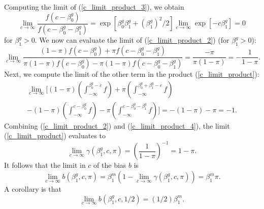 \documentclass[12pt]{article}
\begin{document}
Computing the limit of (\ref{c_limit_product_3}), we obtain
$$
\lim_{c \to \infty} \frac{f(c - \beta^g_0)}{f(c - \beta^g_0 - \beta^g_1)} = \exp[ \beta^g_0 \beta^g_1 + (\beta^g_1)^2/2] \lim_{c \to \infty} \exp[ -c \beta^g_1] = 0
$$ for $\beta^g_1 > 0$. We now can evaluate the limit of (\ref{c_limit_product_2}) (for $\beta^g_1 > 0$):
$$ \lim_{c \to \infty} \frac{(1-\pi) f(c - \beta^g_0) + \pi f(c - \beta^g_0 - \beta^g_1)}{\pi (1-\pi) f(c - \beta^g_0) - \pi (1-\pi)f(c - \beta^g_0 - \beta^g_1)} = \frac{-\pi}{\pi(1-\pi)} = -\frac{1}{1 -\pi}.$$ Next, we compute the limit of the other term in the product (\ref{c_limit_product}):
\begin{multline}\label{c_limit_product_4}
\lim_{c \to \infty} \bigg[ (1-\pi)\left( \int_{-\infty}^{\beta_0^g - c} f \right) + \pi \left(\int_{-\infty}^{ \beta^g_0 + \beta^g_1 - c} f \right) \\ - (1-\pi)\left(\int_{-\infty}^{c - \beta^g_0} f \right) - \pi \left(\int_{-\infty}^{c - \beta_0^g - \beta_1^g} f \right) \bigg] = -(1-\pi) - \pi = -1.
\end{multline}
Combining (\ref{c_limit_product_2}) and (\ref{c_limit_product_4}), the limit (\ref{c_limit_product}) evaluates to
$$ \lim_{c \to \infty} \gamma(\beta^g_1, c, \pi) = \left(  \frac{ 1 }{ 1 - \pi }\right)^{-1} = 1 - \pi.$$ It follows that the limit in $c$ of the bias $b$ is
$$\lim_{c \to \infty} b(\beta^g_1, c, \pi) = \beta_1^m(1 - \lim_{c \to \infty} \gamma(\beta^g_1, c, \pi)) = \beta^m_1 \pi.$$
A corollary is that
$$\lim_{c \to \infty} b(\beta^g_1, c, 1/2) = (1/2)\beta^m_1.$$
\end{document}
